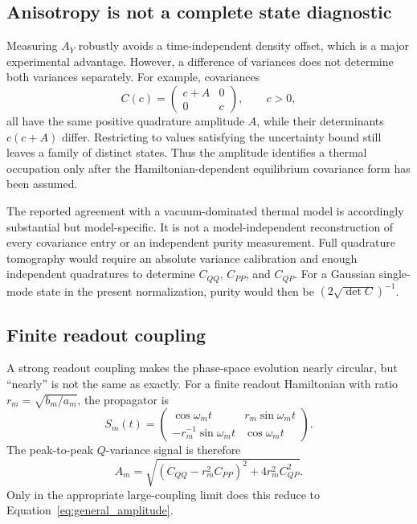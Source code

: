 \documentclass[11pt,a4paper]{article}
\theoremstyle{definition}
\theoremstyle{remark}
\begin{document}
\subsection{Anisotropy is not a complete state diagnostic}
Measuring $A_Y$ robustly avoids a time-independent density offset, which is a major experimental advantage. However, a difference of variances does not determine both variances separately. For example, covariances
\begin{equation}
 C(c)=\begin{pmatrix}c+A&0\\0&c\end{pmatrix},\qquad c>0,
 \label{eq:ambiguity_cov}
\end{equation}
all have the same positive quadrature amplitude $A$, while their determinants $c(c+A)$ differ. Restricting to values satisfying the uncertainty bound still leaves a family of distinct states. Thus the amplitude identifies a thermal occupation only after the Hamiltonian-dependent equilibrium covariance form has been assumed.

The reported agreement with a vacuum-dominated thermal model is accordingly substantial but model-specific. It is not a model-independent reconstruction of every covariance entry or an independent purity measurement. Full quadrature tomography would require an absolute variance calibration and enough independent quadratures to determine $C_{QQ}$, $C_{PP}$, and $C_{QP}$. For a Gaussian single-mode state in the present normalization, purity would then be $(2\sqrt{\det C})^{-1}$.\cite{zhang2026,weedbrook}

\subsection{Finite readout coupling}
A strong readout coupling makes the phase-space evolution nearly circular, but ``nearly'' is not the same as exactly. For a finite readout Hamiltonian with ratio $r_m=\sqrt{b_m/a_m}$, the propagator is
\begin{equation}
 S_m(t)=\begin{pmatrix}
 \cos\omega_mt&r_m\sin\omega_mt\\
 -r_m^{-1}\sin\omega_mt&\cos\omega_mt
 \end{pmatrix}.
 \label{eq:readoutS}
\end{equation}
The peak-to-peak $Q$-variance signal is therefore
\begin{equation}
 A_m=\sqrt{(C_{QQ}-r_m^2C_{PP})^2+4r_m^2C_{QP}^2}.
 \label{eq:finite_rotation}
\end{equation}
Only in the appropriate large-coupling limit does this reduce to Equation~\eqref{eq:general_amplitude}.
\end{document}
